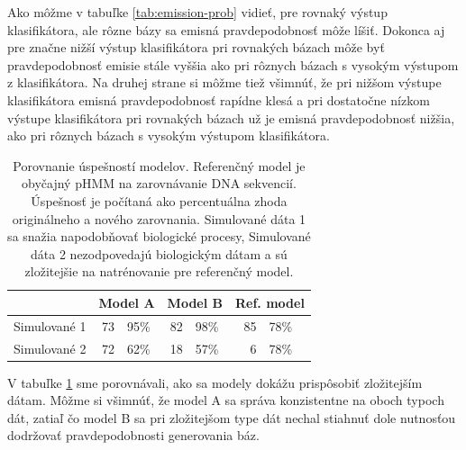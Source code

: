 Ako môžme v tabuľke \ref{tab:emission-prob} vidieť, pre rovnaký výstup klasifikátora, ale rôzne bázy sa emisná pravdepodobnosť môže líšiť. Dokonca aj pre značne nižší výstup klasifikátora pri rovnakých bázach môže byť pravdepodobnosť emisie stále vyššia ako pri rôznych bázach s vysokým výstupom z klasifikátora. Na druhej strane si môžme tiež všimnúť, že pri nižšom výstupe klasifikátora emisná pravdepodobnosť rapídne klesá a pri dostatočne nízkom výstupe klasifikátora pri rovnakých bázach už je emisná pravdepodobnosť nižšia, ako pri rôznych bázach s vysokým výstupom klasifikátora.

\begin{table}[htp]
\centering
\begin{tabular}{c|r@{,}lr@{,}lr@{,}l}
& \multicolumn{2}{c}{Model A}  & \multicolumn{2}{c}{Model B} & \multicolumn{2}{c}{Ref. model}\\
\hline
Simulované 1 & 73 & 95\% & 82 & 98\% & 85 & 78\%\\
Simulované 2 & 72 & 62\% & 18 & 57\% & 6 & 78\% \\
\end{tabular}
\vspace{0.5cm}
\caption[Porovnanie úspešností modelov]{Porovnanie úspešností modelov. Referenčný model je obyčajný pHMM na zarovnávanie DNA sekvencií. Úspešnosť je počítaná ako percentuálna zhoda originálneho a nového zarovnania. Simulované dáta 1 sa snažia napodobňovať biologické procesy, Simulované dáta 2 nezodpovedajú biologickým dátam a sú zložitejšie na natrénovanie pre referenčný model.}
\label{tab:success-compare}
\end{table}

V tabuľke \ref{tab:success-compare} sme porovnávali, ako sa modely dokážu prispôsobiť zložitejším dátam. Môžme si všimnúť, že model A sa správa konzistentne na oboch typoch dát, zatiaľ čo model B sa pri zložitejšom type dát nechal stiahnuť dole nutnosťou dodržovať pravdepodobnosti generovania báz.
